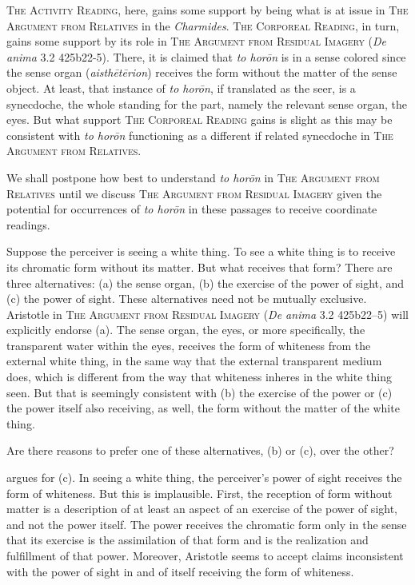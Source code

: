 \textsc{The Activity Reading}, here, gains some support by being what is at issue in \textsc{The Argument from Relatives} in the \emph{Charmides}. \textsc{The Corporeal Reading}, in turn, gains some support by its role in \textsc{The Argument from Residual Imagery} (\emph{De anima} 3.2 425b22-5). There, it is claimed that \emph{to horōn} is in a sense colored since the sense organ (\emph{aisthētērion}) receives the form without the matter of the sense object. At least, that instance of \emph{to horōn}, if translated as the seer, is a synecdoche, the whole standing for the part, namely the relevant sense organ, the eyes. But what support \textsc{The Corporeal Reading} gains is slight as this may be consistent with \emph{to horōn} functioning as a different if related synecdoche in \textsc{The Argument from Relatives}. 

We shall postpone how best to understand \emph{to horōn} in \textsc{The Argument from Relatives} until we discuss \textsc{The Argument from Residual Imagery} given the potential for occurrences of \emph{to horōn} in these passages to receive coordinate readings. 

Suppose the perceiver is seeing a white thing. To see a white thing is to receive its chromatic form without its matter. But what receives that form? There are three alternatives: (a) the sense organ, (b) the exercise of the power of sight, and (c) the power of sight. These alternatives need not be mutually exclusive. Aristotle in \textsc{The Argument from Residual Imagery} (\emph{De anima} 3.2 425b22–5) will explicitly endorse (a). The sense organ, the eyes, or more specifically, the transparent water within the eyes, receives the form of whiteness from the external white thing, in the same way that the external transparent medium does, which is different from the way that whiteness inheres in the white thing seen. But that is seemingly consistent with (b) the exercise of the power or (c) the power itself also receiving, as well, the form without the matter of the white thing.

Are there reasons to prefer one of these alternatives, (b) or (c), over the other?

\citet{Johansen:2005hz} argues for (c). In seeing a white thing, the perceiver's power of sight receives the form of whiteness. But this is implausible. First, the reception of form without matter is a description of at least an aspect of an exercise of the power of sight, and not the power itself. The power receives the chromatic form only in the sense that its exercise is the assimilation of that form and is the realization and fulfillment of that power. Moreover, Aristotle seems to accept claims inconsistent with the power of sight in and of itself receiving the form of whiteness. 

